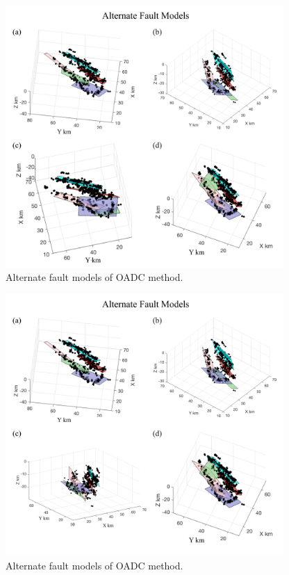 \documentclass[draft]{agujournal2018}
\begin{document}
\begin{figure}[ht]
\centering
\includegraphics[width=25pc]{Figures/OADC_fig_3.png}
\caption{Alternate fault models of OADC method.}
\label{figsix}
\end{figure}

\begin{figure}[ht]
\centering
\includegraphics[width=25pc]{Figures/OADC_fig_3b.png}
\caption{Alternate fault models of OADC method.}
\label{figsix}
\end{figure}
\end{document}
